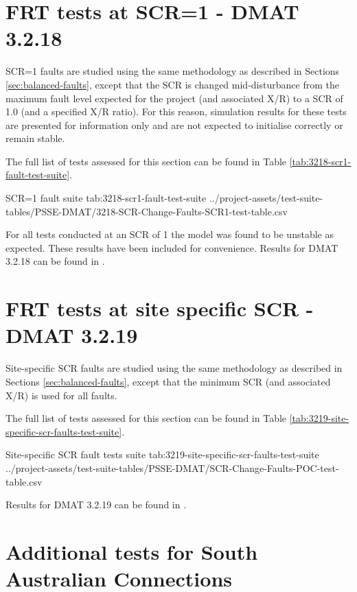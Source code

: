 \documentclass{../grid-link-report}
\newcommand{\projectassetsdir}{../project-assets}
\begin{document}
	
	\section{FRT tests at SCR=1 - DMAT 3.2.18}		
	
	SCR=1 faults are studied using the same methodology as described in Sections \ref{sec:balanced-faults}, except that the SCR is changed mid-disturbance from the maximum fault level expected for the project (and associated X/R) to a SCR of 1.0 (and a specified X/R ratio). For this reason, simulation results for these tests are presented for information only and are not expected to initialise correctly or remain stable.
	
	The full list of tests assessed for this section can be found in Table \ref{tab:3218-scr1-fault-test-suite}.
	
	{
		\fontsize{5}{7}\selectfont
		\autoscaledlongtable
		{SCR=1 fault suite}
		{tab:3218-scr1-fault-test-suite}
		{\projectassetsdir/test-suite-tables/PSSE-DMAT/3218-SCR-Change-Faults-SCR1-test-table.csv}
	}
	
	
	
	For all tests conducted at an SCR of 1 the model was found to be unstable as expected. These results have been included for convenience. Results for DMAT 3.2.18 can be found in .
		
	
	\section{FRT tests at site specific SCR - DMAT 3.2.19}		
	
	
	Site-specific SCR faults are studied using the same methodology as described in Sections \ref{sec:balanced-faults}, except that the minimum SCR (and associated X/R) is used for all faults.
	
	The full list of tests assessed for this section can be found in Table \ref{tab:3219-site-specific-scr-faults-test-suite}.
	
	{
		\fontsize{4}{6}\selectfont
		\autoscaledlongtable
		{Site-specific SCR fault tests suite}
		{tab:3219-site-specific-scr-faults-test-suite}
		{\projectassetsdir/test-suite-tables/PSSE-DMAT/SCR-Change-Faults-POC-test-table.csv}
	}
	
	Results for DMAT 3.2.19 can be found in .
	
	\section{Additional tests for South Australian Connections}
	
\end{document}
